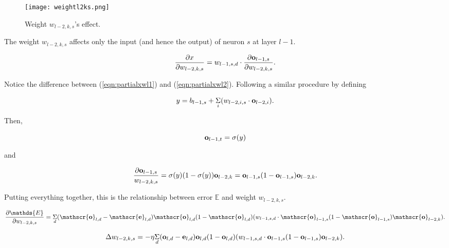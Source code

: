 \begin{figure}[h]
\centering
{\texttt{[image: weightl2ks.png]}}
\caption{Weight $w_{l-2, k,s}$'s effect.}
  \label{fig:weightl2ks}
\end{figure}


The weight $w_{l-2, k, s}$ affects only the input (and hence the
output) of neuron $s$ at layer $l-1$.


\begin{equation}
\frac{\partial x} {\partial w_{l-2, k, s}} = w_{l-1,  s, d}
\cdot
\frac{\partial \mathscr{\bf o}_{l-1, s}}{\partial w_{l-2,  k, s}}.
\label{eqn:partialxwl2}
\end{equation}

Notice the difference between (\ref{eqn:partialxwl1}) and
(\ref{eqn:partialxwl2}).    Following a similar
procedure by defining

\begin{equation}
y =  b_{l-1, s} + \underset{i}{\Sigma} (w_{l-2, i, s}
\cdot \mathscr{\bf o}_{l- 2,  i}).
\end{equation}

Then,

\begin{equation}
\mathscr{\bf o}_{l-1, t} = \sigma(y)
\end{equation}

and

\begin{equation}
\frac{\partial \mathscr{\bf o}_{l-1, s}}{w_{l-2, k, s}}  =
\sigma (y)(1 - \sigma(y)) \mathscr{\bf o}_{l-2, k}
= \mathscr{\bf o}_{l-1, s} (1 - \mathscr{\bf o}_{l-1, s})
\mathscr{\bf o}_{l-2, k}.
\end{equation}

Putting everything together, this is the relationship between error
$\mathds{E}$ and weight $w_{l-2, k, s}$.

\begin{equation}
\frac{\partial \mathds{E}}{\partial w_{l-2,  k, s}}
= \underset{d}{\Sigma}
(\mathscr{\bf o}_{l, d} -   \mathscr{\bf e} _{l, d})
\mathscr{\bf o}_{l, d}
(1 - \mathscr{\bf o}_{l, d})
 (w_{l-1, s, d} \cdot
 \mathscr{\bf o}_{l-1, s}
  (1 - \mathscr{\bf o}_{l-1, s})
\mathscr{\bf o}_{l-2, k}).
\end{equation}



\begin{equation}
\Delta  w_{l-2,  k, s}
= -\eta \underset{d}{\Sigma}
(\mathscr{\bf o}_{l, d} -   \mathscr{\bf e} _{l, d})
\mathscr{\bf o}_{l, d}
(1 - \mathscr{\bf o}_{l, d})
 (w_{l-1, s, d} \cdot
 \mathscr{\bf o}_{l-1, s}
  (1 - \mathscr{\bf o}_{l-1, s})
\mathscr{\bf o}_{l-2, k}).
\end{equation}

